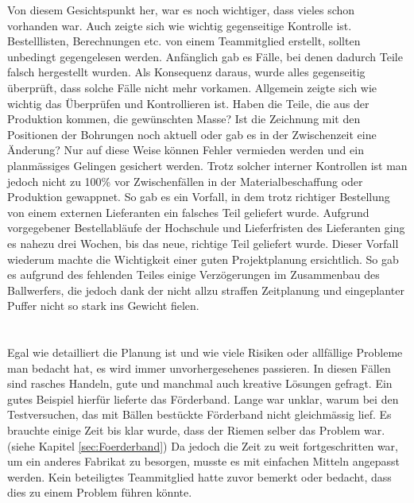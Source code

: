 Von diesem Gesichtspunkt her, war es noch wichtiger, dass vieles schon vorhanden war. Auch zeigte sich wie 
wichtig gegenseitige Kontrolle ist. Bestelllisten, Berechnungen etc. von einem Teammitglied erstellt, sollten 
unbedingt gegengelesen werden. Anfänglich gab es Fälle, bei denen dadurch Teile falsch hergestellt wurden. 
Als Konsequenz daraus, wurde alles gegenseitig überprüft, dass solche Fälle nicht mehr vorkamen. Allgemein 
zeigte sich wie wichtig das Überprüfen und Kontrollieren ist. Haben die Teile, die aus der Produktion kommen, 
die gewünschten Masse? Ist die Zeichnung mit den Positionen der Bohrungen noch aktuell oder gab es in der 
Zwischenzeit eine Änderung? Nur auf diese Weise können Fehler vermieden werden und ein planmässiges Gelingen gesichert werden. 
Trotz solcher interner Kontrollen ist man jedoch nicht zu 100\% vor Zwischenfällen in der Materialbeschaffung 
oder Produktion gewappnet. So gab es ein Vorfall, in dem trotz richtiger Bestellung von einem externen Lieferanten 
ein falsches Teil geliefert wurde. Aufgrund vorgegebener Bestellabläufe der Hochschule und Lieferfristen des 
Lieferanten ging es nahezu drei Wochen, bis das neue, richtige Teil geliefert wurde. Dieser Vorfall wiederum 
machte die Wichtigkeit einer guten Projektplanung ersichtlich. So gab es aufgrund des fehlenden Teiles einige 
Verzögerungen im Zusammenbau des Ballwerfers, die jedoch dank der nicht allzu straffen Zeitplanung und 
eingeplanter Puffer nicht so stark ins Gewicht fielen.\\
\\
\\ 
Egal wie detailliert die Planung ist und wie viele Risiken oder allfällige Probleme man bedacht hat, es wird immer unvorhergesehenes passieren. 
In diesen Fällen sind rasches Handeln, gute und manchmal auch kreative Lösungen gefragt. Ein gutes Beispiel hierfür lieferte das Förderband.
Lange war unklar, warum bei den Testversuchen, das mit Bällen bestückte Förderband nicht gleichmässig lief. 
Es brauchte einige Zeit bis klar wurde, dass der Riemen selber das Problem war. (siehe Kapitel \ref{sec:Foerderband})
Da jedoch die Zeit zu weit fortgeschritten war, um ein anderes Fabrikat zu besorgen, musste es mit einfachen Mitteln angepasst werden. 
Kein beteiligtes Teammitglied hatte zuvor bemerkt oder bedacht, dass dies zu einem Problem führen könnte. 
